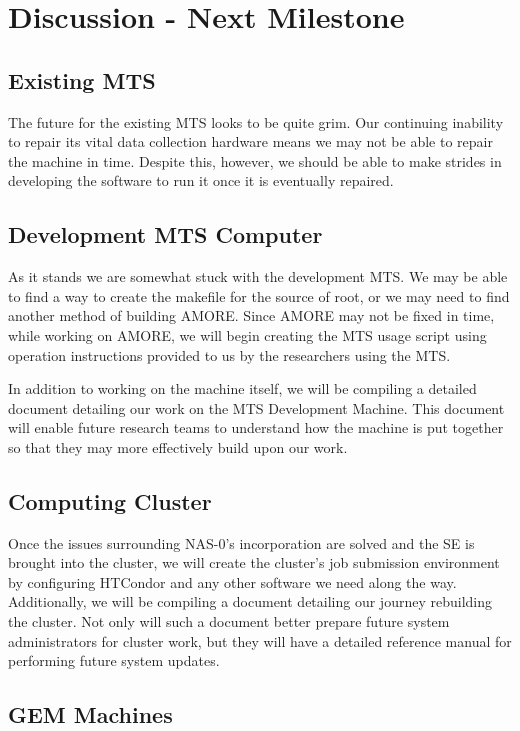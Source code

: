 \documentclass[12pt]{article}
\newcommand\tab[1][1cm]{\hspace*{#1}}
\begin{document}
\section{Discussion - Next Milestone}

\subsection{Existing MTS}

\tab The future for the existing MTS looks to be quite grim. Our continuing
inability to repair its vital data collection hardware means we may not be able
to repair the machine in time. Despite this, however, we should be able to make
strides in developing the software to run it once it is eventually repaired.

\subsection{Development MTS Computer}

\tab As it stands we are somewhat stuck with the development MTS. We may be able
to find a way to create the makefile for the source of root, or we may need to
find another method of building AMORE. Since AMORE may not be fixed in time,
while working on AMORE, we will begin creating the MTS usage script using
operation instructions provided to us by the researchers using the MTS.

\tab In addition to working on the machine itself, we will be compiling a
detailed document detailing our work on the MTS Development Machine. This
document will enable future research teams to understand how the machine is put
together so that they may more effectively build upon our work.

\subsection{Computing Cluster}

\tab Once the issues surrounding NAS-0's incorporation are solved and the SE is
brought into the cluster, we will create the cluster's job submission
environment by configuring HTCondor and any other software we need along the
way. Additionally, we will be compiling a document detailing our journey
rebuilding the cluster. Not only will such a document better prepare future
system administrators for cluster work, but they will have a detailed reference
manual for performing future system updates.

\subsection{GEM Machines}
\end{document}
